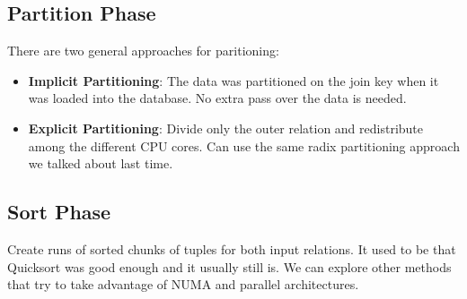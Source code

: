 \documentclass[11pt]{article}
\begin{document}
\subsection*{Partition Phase}
There are two general approaches for paritioning:
\begin{itemize}
	\item \textbf{Implicit Partitioning}: 
	The data was partitioned on the join key when it was loaded into the database.
	No extra pass over the data is needed.
	
	\item \textbf{Explicit Partitioning}: 
	Divide only the outer relation and redistribute among the different CPU cores.
	Can use the same radix partitioning approach we talked about last time.

\end{itemize}

\subsection*{Sort Phase}
Create runs of sorted chunks of tuples for both input relations. It used to be that Quicksort was good enough and it usually still is. We can explore other methods that try to take advantage of NUMA and parallel architectures.
\end{document}
